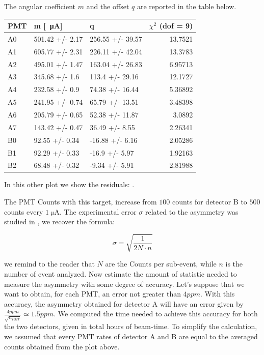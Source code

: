 The angular coefficient $m$ and the offset $q$ are reported in the table below. 

\begin{table}[ht]
\centering
\begin{tabular}{lllr}
\hline
 PMT   & m [\SI{}{\micro \ampere}]          & q                &  $\chi^{2}$ (dof = 9) \\
\hline
 A0    & 501.42 +/- 2.17 & 256.55 +/- 39.57 & 13.7521  \\
 A1    & 605.77 +/- 2.31 & 226.11 +/- 42.04 & 13.3783  \\
 A2    & 495.01 +/- 1.47 & 163.04 +/- 26.83 &  6.95713 \\
 A3    & 345.68 +/- 1.6  & 113.4 +/- 29.16  & 12.1727  \\
 A4    & 232.58 +/- 0.9  & 74.38 +/- 16.44  &  5.36892 \\
 A5    & 241.95 +/- 0.74 & 65.79 +/- 13.51  &  3.48398 \\
 A6    & 205.79 +/- 0.65 & 52.38 +/- 11.87  &  3.0892  \\
 A7    & 143.42 +/- 0.47 & 36.49 +/- 8.55   &  2.26341 \\
 B0    & 92.55 +/- 0.34  & -16.88 +/- 6.16  &  2.05286 \\
 B1    & 92.29 +/- 0.33  & -16.9 +/- 5.97   &  1.92163 \\
 B2    & 68.48 +/- 0.32  & -9.34 +/- 5.91   &  2.81988 \\
\hline
\end{tabular}
\end{table}

In this other plot we show the residuals: .

The PMT Counts with this target, increase from $100$ counts for detector B to $500$ counts every $\SI{1}{\micro \ampere}$.  The experimental error $\sigma$ related to the asymmetry was studied in , we recover the formula:

\begin{equation}
\sigma = \sqrt{\dfrac{1}{2 N \cdot n}}
\end{equation}

we remind to the reader that $N$ are the Counts per sub-event, while  $n$ is the number of event analyzed.
Now estimate the amount of statistic needed to measure the asymmetry with some degree of accuracy. Let's suppose that we want to obtain, for each PMT, an error not greater than $4 ppm$. With this accuracy, the asymmetry obtained for detector A will have an error given by $\frac{4ppm}{\sqrt{n_{PMT}}} \simeq 1.5 ppm$.
We computed the time needed to achieve this accuracy for both the two detectors, given in total hours of beam-time. To simplify the calculation, we assumed that every PMT rates of detector A and B are equal to the averaged counts obtained from the plot above.

